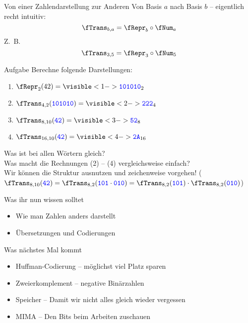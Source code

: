 \begin{frame}{Von einer Zahlendarstellung zur Anderen}
	\vspace{-.2\baselineskip}
	Von Basis $a$ nach Basis $b$ -- eigentlich recht intuitiv:
	$$\fTrans_{b,a} = \fRepr_b \after \fNum_a$$
	Z.~B.
	$$\fTrans_{3,5} = \fRepr_3 \after \fNum_5$$
	
	\begin{block}{Aufgabe}
		Berechne folgende Darstellungen:\\
		\begin{enumerate}[(1)]
			\item $\fRepr_2(42) = \visible<1->{ \word{101010}_2}$ 
			\item $\fTrans_{4,2}(\word{101010}) = \visible<2->{ \word{222}_4}$ 
			\item $\fTrans_{8,10}(\word{42}) = \visible<3->{ \word{52}_8}$ 
			\item $\fTrans_{16,10}(\word{42}) = \visible<4->{ \word{2A}_{16}}$
		\end{enumerate}
	\end{block}

	Was ist bei allen Wörtern gleich?  \\
	Was macht die Rechnungen (2) -- (4) vergleichsweise einfach? \pause[6] \\
	\impl Wir können die Struktur ausnutzen und zeichenweise vorgehen! ($\fTrans_{8,10}(\word{42}) = \fTrans_{8,2}(\word{101} \cdot \word{010}) = \fTrans_{8,2}(\word{101}) \cdot \fTrans_{8,2}(\word{010})$)
\end{frame}



%

\begin{frame}	
	\begin{block}{Was ihr nun wissen solltet}
		\begin{itemize}
			\item Wie man Zahlen anders darstellt
			\item Übersetzungen und Codierungen
		\end{itemize}
	\end{block}
	
	\begin{block}{Was nächstes Mal kommt}
		\begin{itemize}
			\item Huffman-Codierung -- möglichst viel Platz sparen
			\item Zweierkomplement -- negative Binärzahlen
			\item Speicher -- Damit wir nicht alles gleich wieder vergessen
			\item MIMA -- Den Bits beim Arbeiten zuschauen
		\end{itemize}
	\end{block}
\end{frame}


\slideThanks

